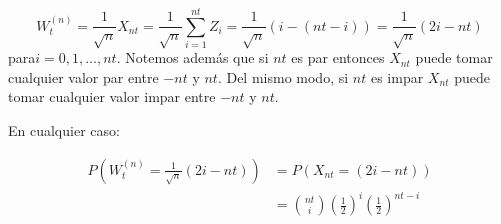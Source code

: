 \documentclass{extreport}
\theoremstyle{definicion}
\theoremstyle{propiedad}
\theoremstyle{teorema}
\begin{document}
$$
W_{t}^{(n)} =\frac{1}{\sqrt{n}}X_{nt} =  \frac{1}{\sqrt{n}}\sum_{i=1}^{nt}Z_i = \frac{1}{\sqrt{n}}\left(i-(nt-i)\right)= \frac{1}{\sqrt{n}}\left(2i-nt\right)
$$
para$i=0,1,\ldots, nt$. Notemos además que si $nt$  es par entonces $X_{nt}$  puede tomar cualquier valor par entre $-nt$ y $nt$. Del mismo modo, si $nt$ es impar $X_{nt}$ puede tomar cualquier valor impar entre $-nt$ y $nt$.

En cualquier caso:

\begin{align*}
P\left(W_{t}^{(n)} = \frac{1}{\sqrt{n}} (2i-nt)\right) & = P\left(X_{nt} =(2i-nt) \right)\\
                                                       &= \binom{nt}{i}\left(\frac{1}{2}\right)^i\left(\frac{1}{2}\right)^{nt-i}
\end{align*}
\end{document}
